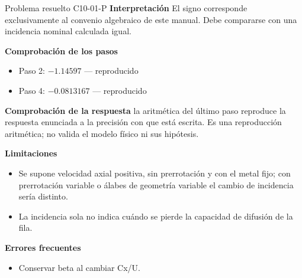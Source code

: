 \documentclass[10pt,openany]{book}
\begin{document}
\begin{studiumworked}{Problema resuelto C10-01-P}
\noindent\textbf{Interpretación}
El signo corresponde exclusivamente al convenio algebraico de este manual. Debe compararse con una incidencia nominal calculada igual.

\noindent\textbf{Comprobación de los pasos}
\begin{itemize}
\item Paso 2: $-1.14597$ — reproducido
\item Paso 4: $-0.0813167$ — reproducido
\end{itemize}

\noindent\textbf{Comprobación de la respuesta} la aritmética del último paso reproduce la respuesta enunciada a la precisión con que está escrita. Es una reproducción aritmética; no valida el modelo físico ni sus hipótesis.

\noindent\textbf{Limitaciones}
\begin{itemize}
\item Se supone velocidad axial positiva, sin prerrotación y con el metal fijo; con prerrotación variable o álabes de geometría variable el cambio de incidencia sería distinto.
\item La incidencia sola no indica cuándo se pierde la capacidad de difusión de la fila.
\end{itemize}

\noindent\textbf{Errores frecuentes}
\begin{itemize}
\item Conservar beta al cambiar Cx/U.
\end{itemize}
\end{studiumworked}
\end{document}
